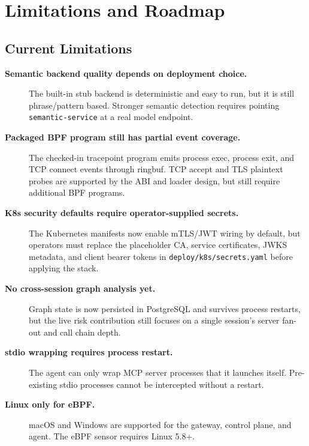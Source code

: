 \documentclass[12pt,a4paper]{report}
\begin{document}
\chapter{Limitations and Roadmap}

\section{Current Limitations}

\begin{description}
  \item[\textbf{Semantic backend quality depends on deployment choice.}] The
    built-in stub backend is deterministic and easy to run, but it is still
    phrase/pattern based. Stronger semantic detection requires pointing
    \texttt{semantic-service} at a real model endpoint.

  \item[\textbf{Packaged BPF program still has partial event coverage.}] The
    checked-in tracepoint program emits process exec, process exit, and TCP
    connect events through ringbuf. TCP accept and TLS plaintext probes are
    supported by the ABI and loader design, but still require additional BPF
    programs.

  \item[\textbf{K8s security defaults require operator-supplied secrets.}] The
    Kubernetes manifests now enable mTLS/JWT wiring by default, but operators
    must replace the placeholder CA, service certificates, JWKS metadata, and
    client bearer tokens in \texttt{deploy/k8s/secrets.yaml} before applying the
    stack.

  \item[\textbf{No cross-session graph analysis yet.}] Graph state is now
    persisted in PostgreSQL and survives process restarts, but the live risk
    contribution still focuses on a single session's server fan-out and call
    chain depth.

  \item[\textbf{stdio wrapping requires process restart.}] The agent can
    only wrap MCP server processes that it launches itself. Pre-existing
    stdio processes cannot be intercepted without a restart.

  \item[\textbf{Linux only for eBPF.}] macOS and Windows are supported for
    the gateway, control plane, and agent. The eBPF sensor requires Linux 5.8+.
\end{description}
\end{document}
